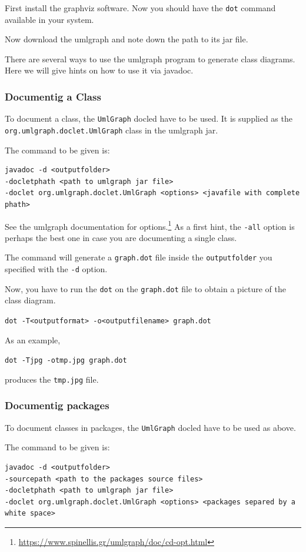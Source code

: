 \documentclass{book}
\begin{document}
First install the graphviz software. Now you should have the \verb+dot+ command available in your system.

Now download the umlgraph and note down the path to its jar file.

There are several ways to use the umlgraph program to generate class diagrams. Here we will give hints on how to use it via javadoc.

\subsubsection{Documentig a Class}

To document a class, the \verb+UmlGraph+ docled have to be used. It is supplied as the \verb+org.umlgraph.doclet.UmlGraph+ class in the umlgraph jar.

The command to be given is:

\begin{verbatim}
javadoc -d <outputfolder> 
-docletphath <path to umlgraph jar file>
-doclet org.umlgraph.doclet.UmlGraph <options> <javafile with complete phath>
\end{verbatim}

See the umlgraph documentation for options.\footnote{\url{https://www.spinellis.gr/umlgraph/doc/cd-opt.html}} As a first hint, the \verb+-all+ option is perhaps the best one in case you are documenting a single class. 

The command will generate a \verb+graph.dot+ file inside the \verb+outputfolder+ you specified with the \verb+-d+ option.

Now, you have to run the \verb+dot+ on the \verb+graph.dot+ file to obtain a picture of the class diagram.


\verb+dot -T<outputformat> -o<outputfilename> graph.dot+

As an example,

\verb+dot -Tjpg -otmp.jpg graph.dot+

produces the \verb+tmp.jpg+ file.

\subsubsection{Documentig packages}

To document classes in packages, the \verb+UmlGraph+ docled have to be used as above.

The command to be given is:

\begin{verbatim}
javadoc -d <outputfolder>
-sourcepath <path to the packages source files>
-docletphath <path to umlgraph jar file>
-doclet org.umlgraph.doclet.UmlGraph <options> <packages separed by a white space>
\end{verbatim}
\end{document}
